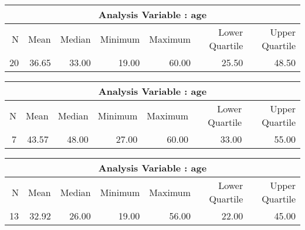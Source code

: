\documentclass[10pt]{article}
\begin{document}
\par 
{}


\begin{longtable}{|r|r|r|r|r|r|r|}\hline
   \multicolumn{7}{|c|}{Analysis Variable : age }\\\hline
   N &    Mean &    Median &    Minimum &    Maximum &    Lower Quartile &    Upper Quartile\\\hline
\endhead
   20 &    36.65 &    33.00 &    19.00 &    60.00 &    25.50 &    48.50\\\hline
\end{longtable}


\pagebreak




\begin{longtable}{|r|r|r|r|r|r|r|}\hline
   \multicolumn{7}{|c|}{Analysis Variable : age }\\\hline
   N &    Mean &    Median &    Minimum &    Maximum &    Lower Quartile &    Upper Quartile\\\hline
\endhead
   7 &    43.57 &    48.00 &    27.00 &    60.00 &    33.00 &    55.00\\\hline
\end{longtable}




\begin{longtable}{|r|r|r|r|r|r|r|}\hline
   \multicolumn{7}{|c|}{Analysis Variable : age }\\\hline
   N &    Mean &    Median &    Minimum &    Maximum &    Lower Quartile &    Upper Quartile\\\hline
\endhead
   13 &    32.92 &    26.00 &    19.00 &    56.00 &    22.00 &    45.00\\\hline
\end{longtable}


\pagebreak


\pagebreak
\end{document}
